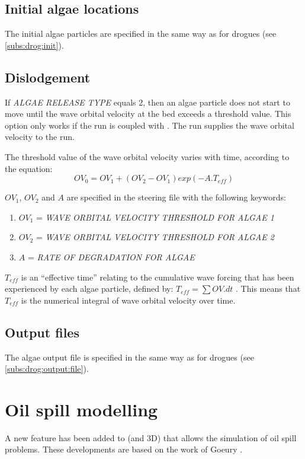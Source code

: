 \subsection{Initial algae locations}

The initial algae particles are specified in the same way as for drogues (see \ref{subs:drog:init}). 

\subsection{Dislodgement}
\label{subs:alg:disl}

If \textit{ALGAE RELEASE TYPE} equals 2, then an algae particle does not start to move until the wave orbital velocity at the bed exceeds a threshold value.  This option only works if the  run is coupled with \tomawac.  The \tomawac run supplies the wave orbital velocity to the  run.

The threshold value of the wave orbital velocity varies with time, according to the equation:
\begin{equation}
OV_0 = OV_1 + (OV_2 - OV_1) exp(-A . T_{eff})
\end{equation}

$OV_{1}$, $OV_{2}$ and $ A $ are specified in the steering file with the following keywords:

\begin{enumerate}
\item[\nonumber] $OV_{1}$ = \textit{WAVE ORBITAL VELOCITY THRESHOLD FOR ALGAE 1}
\item[\nonumber] $OV_{2}$ = \textit{WAVE ORBITAL VELOCITY THRESHOLD FOR ALGAE 2}
\item[\nonumber] $A$ = \textit{RATE OF DEGRADATION FOR ALGAE}
\end{enumerate}

$T_{eff}$ is an “effective time” relating to the cumulative wave forcing that has been experienced by each algae particle, defined by: $T_{eff} = \sum { OV . dt}$ . This means that $T_{eff}$ is the numerical integral of wave orbital velocity over time.


\subsection{ Output files}

 The algae output file is specified in the same way as for drogues (see \ref{subs:drog:output:file}).


\section{ Oil spill modelling}
\label{sec:oil:spill:modell}
 A new feature has been added to  (and 3D) that allows the simulation of oil spill problems. These developments are based on the work of Goeury \cite{goeury2012}.


